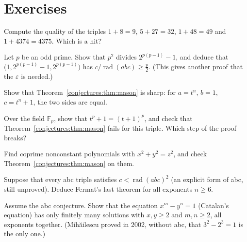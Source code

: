 \section{Exercises}

\begin{exercise}[$\star$]\label{conjectures:ex:quality}
Compute the quality of the triples $1+8=9$, $5+27=32$, $1+48=49$ and $1+4374=4375$. Which is a hit?
\end{exercise}

\begin{exercise}[$\star\star$]\label{conjectures:ex:fermatsquare}
Let $p$ be an odd prime. Show that $p^2$ divides $2^{p(p-1)}-1$, and deduce that $\bigl(1,2^{p(p-1)}-1,2^{p(p-1)}\bigr)$ has
$c/\operatorname{rad}(abc)\ge\frac p2$. (This gives another proof that the $\varepsilon$ is needed.)
\end{exercise}

\begin{exercise}[$\star$]\label{conjectures:ex:masonsharp}
Show that Theorem~\ref{conjectures:thm:mason} is sharp: for $a=t^n$, $b=1$, $c=t^n+1$, the two sides are equal.
\end{exercise}

\begin{exercise}[$\star$]\label{conjectures:ex:charp}
Over the field $\mathbb F_p$, show that $t^p+1=(t+1)^p$, and check that Theorem~\ref{conjectures:thm:mason} fails for this triple. Which step of the proof breaks?
\end{exercise}

\begin{exercise}[$\star$]\label{conjectures:ex:pythpoly}
Find coprime nonconstant polynomials with $x^2+y^2=z^2$, and check Theorem~\ref{conjectures:thm:mason} on them.
\end{exercise}

\begin{exercise}[$\star\star$]\label{conjectures:ex:explicitabc}
Suppose that every abc triple satisfies $c<\operatorname{rad}(abc)^2$ (an explicit form of abc, still unproved). Deduce Fermat's last theorem for all
exponents $n\ge6$.
\end{exercise}

\begin{exercise}[$\star\star$]\label{conjectures:ex:catalan}
Assume the abc conjecture. Show that the equation $x^m-y^n=1$ (Catalan's equation) has only finitely many solutions with $x,y\ge2$ and $m,n\ge2$, all
exponents together. (Mih\u ailescu proved in 2002, without abc, that $3^2-2^3=1$ is the only one.)
\end{exercise}

